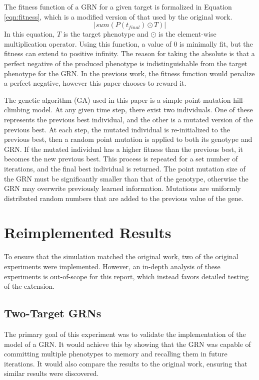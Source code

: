 \documentclass[twocolumn,a4paper,11pt]{article}
\begin{document}
    The fitness function of a GRN for a given target is formalized in Equation \ref{eqn:fitness}, which is a modified version of that used by the original work.
    \begin{equation} \label{eqn:fitness}
        |{sum} (P(t_{final}) \odot T)|
    \end{equation}
    In this equation, $T$ is the target phenotype and $\odot$ is the element-wise multiplication operator. Using this function, a value of 0 is minimally fit, but the fitness can extend to positive infinity. The reason for taking the absolute is that a perfect negative of the produced phenotype is indistinguishable from the target phenotype for the GRN. In the previous work, the fitness function would penalize a perfect negative, however this paper chooses to reward it.

    The genetic algorithm (GA) used in this paper is a simple point mutation hill-climbing model. At any given time step, there exist two individuals. One of these represents the previous best individual, and the other is a mutated version of the previous best. At each step, the mutated individual is re-initialized to the previous best, then a random point mutation is applied to both its genotype and GRN. If the mutated individual has a higher fitness than the previous best, it becomes the new previous best. This process is repeated for a set number of iterations, and the final best individual is returned. The point mutation size of the GRN must be significantly smaller than that of the genotype, otherwise the GRN may overwrite previously learned information. Mutations are uniformly distributed random numbers that are added to the previous value of the gene.

    \section{Reimplemented Results}
    To ensure that the simulation matched the original work, two of the original experiments were implemented. However, an in-depth analysis of these experiments is out-of-scope for this report, which instead favors detailed testing of the extension.

    \subsection{Two-Target GRNs} \label{sec:ttgrn}
    The primary goal of this experiment was to validate the implementation of the model of a GRN. It would achieve this by showing that the GRN was capable of committing multiple phenotypes to memory and recalling them in future iterations. It would also compare the results to the original work, ensuring that similar results were discovered.
\end{document}
